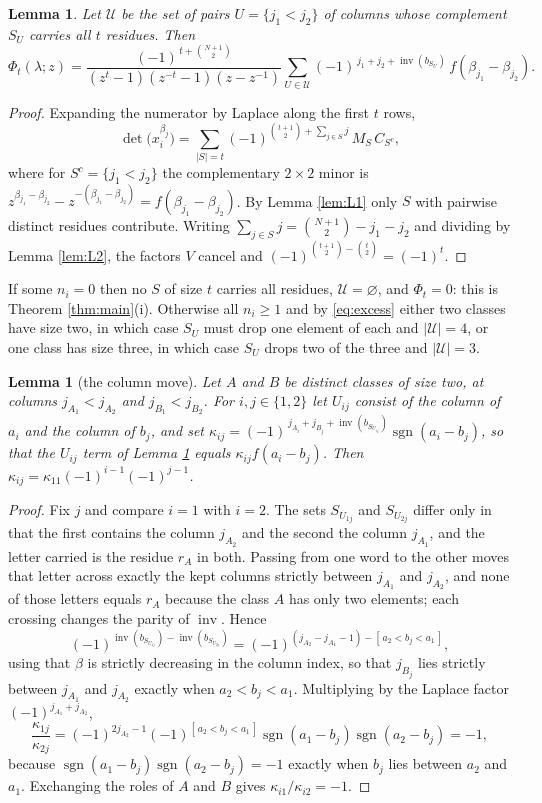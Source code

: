 \documentclass[11pt,reqno]{amsart}
\theoremstyle{plain}
\newtheorem{lemma}[theorem]{Lemma}
\theoremstyle{definition}
\newcommand{\inv}{\operatorname{inv}}
\newcommand{\sgn}{\operatorname{sgn}}
\begin{document}
\begin{lemma}\label{lem:L3}
Let $\mathcal U$ be the set of pairs $U=\{j_1<j_2\}$ of columns whose complement $S_U$ carries all
$t$ residues. Then
\[
\Phi_t(\lambda;z)=\frac{(-1)^{\,t+\binom{N+1}{2}}}{(z^t-1)(z^{-t}-1)(z-z^{-1})}
\sum_{U\in\mathcal U}(-1)^{\,j_1+j_2+\inv(b_{S_U})}\,f(\beta_{j_1}-\beta_{j_2}).
\]
\end{lemma}

\begin{proof}
Expanding the numerator by Laplace along the first $t$ rows,
\[
\det\bigl(x_i^{\beta_j}\bigr)=\sum_{|S|=t}(-1)^{\binom{t+1}{2}+\sum_{j\in S}j}\,M_S\,C_{S^c},
\]
where for $S^c=\{j_1<j_2\}$ the complementary $2\times2$ minor is
$z^{\beta_{j_1}-\beta_{j_2}}-z^{-(\beta_{j_1}-\beta_{j_2})}=f(\beta_{j_1}-\beta_{j_2})$. By Lemma
\ref{lem:L1} only $S$ with pairwise distinct residues contribute. Writing
$\sum_{j\in S}j=\binom{N+1}{2}-j_1-j_2$ and dividing by Lemma \ref{lem:L2}, the factors $V$ cancel
and $(-1)^{\binom{t+1}{2}-\binom{t}{2}}=(-1)^t$.
\end{proof}

If some $n_i=0$ then no $S$ of size $t$ carries all residues, $\mathcal U=\varnothing$, and
$\Phi_t=0$: this is Theorem \ref{thm:main}(i). Otherwise all $n_i\ge1$ and by \eqref{eq:excess}
either two classes have size two, in which case $S_U$ must drop one element of each and
$|\mathcal U|=4$, or one class has size three, in which case $S_U$ drops two of the three and
$|\mathcal U|=3$.

\begin{lemma}[the column move]\label{lem:L4}
Let $A$ and $B$ be distinct classes of size two, at columns $j_{A_1}<j_{A_2}$ and
$j_{B_1}<j_{B_2}$. For $i,j\in\{1,2\}$ let $U_{ij}$ consist of the column of $a_i$ and the column of
$b_j$, and set $\kappa_{ij}=(-1)^{\,j_{A_i}+j_{B_j}+\inv(b_{S_{U_{ij}}})}\sgn(a_i-b_j)$, so that
the $U_{ij}$ term of Lemma \ref{lem:L3} equals $\kappa_{ij}f(a_i-b_j)$. Then
$\kappa_{ij}=\kappa_{11}(-1)^{i-1}(-1)^{j-1}$.
\end{lemma}

\begin{proof}
Fix $j$ and compare $i=1$ with $i=2$. The sets $S_{U_{1j}}$ and $S_{U_{2j}}$ differ only in that the
first contains the column $j_{A_2}$ and the second the column $j_{A_1}$, and the letter carried is
the residue $r_A$ in both. Passing from one word to the other moves that letter across exactly the
kept columns strictly between $j_{A_1}$ and $j_{A_2}$, and none of those letters equals $r_A$
because the class $A$ has only two elements; each crossing changes the parity of $\inv$. Hence
\[
(-1)^{\inv(b_{S_{U_{1j}}})-\inv(b_{S_{U_{2j}}})}
=(-1)^{(j_{A_2}-j_{A_1}-1)-[\,a_2<b_j<a_1\,]},
\]
using that $\beta$ is strictly decreasing in the column index, so that $j_{B_j}$ lies strictly
between $j_{A_1}$ and $j_{A_2}$ exactly when $a_2<b_j<a_1$. Multiplying by the Laplace factor
$(-1)^{j_{A_1}+j_{A_2}}$,
\[
\frac{\kappa_{1j}}{\kappa_{2j}}
=(-1)^{2j_{A_2}-1}(-1)^{[\,a_2<b_j<a_1\,]}\sgn(a_1-b_j)\sgn(a_2-b_j)=-1,
\]
because $\sgn(a_1-b_j)\sgn(a_2-b_j)=-1$ exactly when $b_j$ lies between $a_2$ and $a_1$. Exchanging
the roles of $A$ and $B$ gives $\kappa_{i1}/\kappa_{i2}=-1$.
\end{proof}
\end{document}
